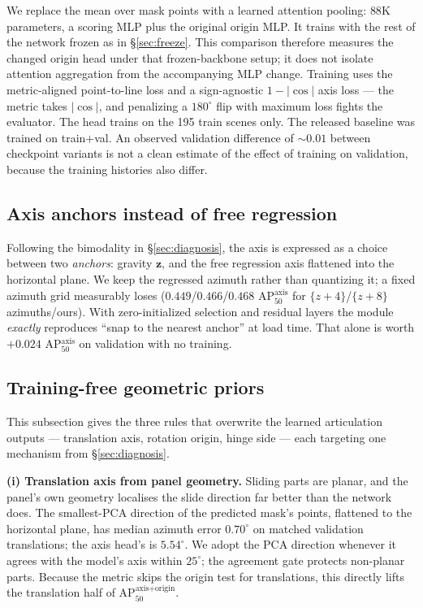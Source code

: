 \documentclass[11pt]{article}
\newcommand{\metric}{AP$_{50}^{\text{axis+origin}}$}
\begin{document}
We replace the mean over mask points with a learned attention pooling:
$88$K parameters, a scoring MLP plus the original origin MLP. It trains with
the rest of the network frozen as in \S\ref{sec:freeze}. This comparison
therefore measures the changed origin head under that frozen-backbone setup;
it does not isolate attention aggregation from the accompanying MLP change.
Training uses the metric-aligned
point-to-line loss and a sign-agnostic $1-|\cos|$ axis loss --- the metric
takes $|\cos|$, and penalizing a $180^\circ$ flip with maximum loss fights
the evaluator. The head trains on the 195 train scenes only. The released
baseline was trained on train$+$val. An observed validation difference of
$\sim$$0.01$ between checkpoint variants is not a clean estimate of the
effect of training on validation, because the training histories also differ.

\subsection{Axis anchors instead of free regression}

Following the bimodality in \S\ref{sec:diagnosis}, the axis is expressed as a
choice between two \emph{anchors}: gravity $\mathbf{z}$, and the free
regression axis flattened into the horizontal plane. We keep the regressed
azimuth rather than quantizing it; a fixed azimuth grid measurably loses
($0.449$/$0.466$/$0.468$ AP$_{50}^{\text{axis}}$ for $\{z{+}4\}$/$\{z{+}8\}$
azimuths/ours). With zero-initialized selection and residual layers the
module \emph{exactly} reproduces ``snap to the nearest anchor'' at load time.
That alone is worth $+0.024$ AP$_{50}^{\text{axis}}$ on validation with no
training.

\subsection{Training-free geometric priors}
\label{sec:geo}

This subsection gives the three rules that overwrite the learned
articulation outputs --- translation axis, rotation origin, hinge side ---
each targeting one mechanism from \S\ref{sec:diagnosis}.

\textbf{(i) Translation axis from panel geometry.} Sliding parts are planar,
and the panel's own geometry localises the slide direction far better than
the network does. The smallest-PCA direction of the predicted mask's points,
flattened to the horizontal plane, has median azimuth error $0.70^\circ$ on
matched validation translations; the axis head's is $5.54^\circ$. We adopt
the PCA direction whenever it agrees with the model's axis within
$25^\circ$; the agreement gate protects non-planar parts. Because the metric
skips the origin test for translations, this directly lifts the translation
half of \metric{}.
\end{document}
